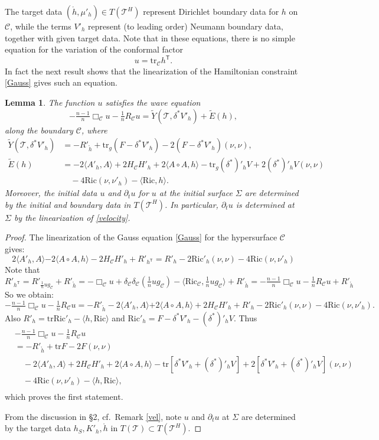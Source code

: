 \documentclass[10pt]{amsart}
\renewcommand{\d}{\delta}
\newcommand{\Si}{\Sigma}
\newcommand{\cC}{{\mathcal C}}
\newcommand{\cT}{{\mathcal T}}
\newcommand{\Ric}{\mathrm{Ric}}
\newcommand{\tT}{\mathsf{T}}
\newcommand{\be}{\begin{equation}}
\newcommand{\ee}{\end{equation}}
\newcommand{\bes}{\begin{equation*}}
\newcommand{\ees}{\end{equation*}}
\newcommand{\tr}{\mathrm{tr}}
\newcommand{\p}{\partial}
\newcommand{\<}{\langle}
\renewcommand{\>}{\rangle}
\newcommand{\w}{\widetilde}
\theoremstyle{plain}
\newtheorem{lemma}{Lemma}[section]
\theoremstyle{remark}
\theoremstyle{definition}
\numberwithin{equation}{section}
\begin{document}
 \medskip 
 
The target data $(\ring{h}, \mu'_h) \in T(\cT^H)$ represent Dirichlet boundary data for $h$ on $\cC$, while the terms $V'_h$ represent (to leading order) 
Neumann boundary data, together with given target data. Note that in these equations, there is no simple equation for the variation of the 
conformal factor 
$$u = \tr_{\cC}h^{\tT}.$$
In fact the next result shows that the linearization of the Hamiltonian constraint \eqref{Gauss} gives such an equation. 

\begin{lemma}\label{u}
The function $u$ satisfies the wave equation 
\be \label{uC}
-\tfrac{n-1}{n}\Box_\cC u-\tfrac{1}{n}R_\cC u = \w Y(\cT, \d^* V'_h) + \w E(h),
\ee
along the boundary $\cC$, where 
\be \label{uinhom}
\begin{split}
\w Y(\cT, \d^*V'_h)&=-R'_{\ring{h}} +\tr_g (F - \d^*V'_h) - 2 (F - \d^*V'_h)(\nu,\nu),\\
\w E(h)&= -2\<A'_h, A\> + 2H_{\cC}H'_h + 2\<A\circ A ,h\> - \tr_g (\d^*)'_h V + 2(\d^*)'_h V(\nu,\nu)\\
&\quad-4\Ric(\nu,\nu'_h) - \<\Ric, h\>.
\end{split}
\ee
Moreover, the initial data $u$ and $\p_t u$ for $u$ at the initial surface $\Si$ are determined by the initial and boundary data 
in $T(\cT^H)$. In particular, $\p_t u$ is determined at $\Si$ by the linearization of \eqref{velocity}. 

\end{lemma} 

\begin{proof} 
The linearization of the Gauss equation \eqref{Gauss} for the hypersurface $\cC$ gives:
\bes
2\<A'_h, A\>{ -2\<A\circ A, h\>}-2H_\cC H'_h + R'_{h^{\tT}}=R'_h-2\Ric'_h(\nu,\nu)-4\Ric(\nu,\nu'_h)
\ees
Note that 
\bes
R'_{h^{\tT}}=R'_{\tfrac{1}{n}ug_{\cC}}+R'_{\ring{h}}=-\Box_\cC u+\d_\cC\d_\cC(\tfrac{1}{n}ug_\cC)-\<\Ric_\cC,\tfrac{1}{n}ug_\cC\> + R'_{\ring{h}}=
-\tfrac{n-1}{n}\Box_\cC u-\tfrac{1}{n}R_\cC u+R'_{\ring{h}}
\ees
So we obtain:
\bes
-\tfrac{n-1}{n}\Box_\cC u-\tfrac{1}{n}R_\cC u=-R'_{\ring{h}}-2\<A'_h, A\>{ +2\<A\circ A,h\>}+2H_\cC H'_h+R'_h-2\Ric'_h(\nu,\nu)-4\Ric(\nu,\nu'_h). 
\ees
Also $R'_h=\tr \Ric'_h-\<h,\Ric\>$ and $\Ric'_h=F-\d^* V'_h-(\d^*)'_h V$. Thus
\bes\begin{split}
&-\tfrac{n-1}{n}\Box_\cC u-\tfrac{1}{n}R_\cC u\\
&=-R'_{\ring{h}} + \tr F -2F(\nu,\nu)\\
&\quad-2\<A'_h, A\> + 2H_{\cC}H'_h +2\<A\circ A,h\> - \tr [\d^*V'_h+(\d^*)'_h V] + 2[\d^*V'_h + (\d^*)'_h V](\nu,\nu) \\
&\quad - 4\Ric(\nu,\nu'_h) - \<h, \Ric\>,\\
\end{split}\ees
which proves the first statement. 

From the discussion in \S 2, cf.~Remark \ref{vel}, note $u$ and $\p_t u$ at $\Si$ are determined by the target data 
$h_S, K'_h, \ring{h}$ in $T(\cT) \subset T(\cT^H)$. 

\end{proof}
\end{document}
